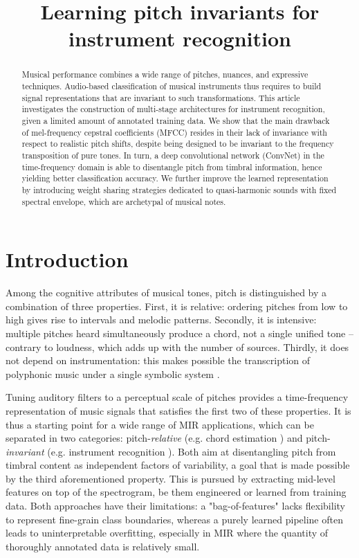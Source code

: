 \documentclass{article}
\title{Learning pitch invariants for instrument recognition}
\makeatletter
\newcommand*{\eg}{e.g.\@\xspace}
\makeatother
\begin{document}
%
\maketitle
%
\begin{abstract}
Musical performance combines a wide range of pitches, nuances,
and expressive techniques.
Audio-based classification of musical instruments thus requires to
build signal representations that are invariant to such transformations.
This article investigates the construction
of multi-stage architectures for instrument recognition,
given a limited amount of annotated training data.
We show that the main drawback of mel-frequency cepstral
coefficients (MFCC) resides in their lack of invariance with respect to
realistic pitch shifts, despite being designed to be invariant
to the frequency transposition of pure tones.
In turn, a deep convolutional network (ConvNet)
in the time-frequency domain is able to disentangle pitch from
timbral information, hence yielding better classification accuracy.
We further improve the learned representation
by introducing weight sharing strategies dedicated to
quasi-harmonic sounds with fixed spectral envelope,
which are archetypal of musical notes.
\end{abstract}

\section{Introduction}\label{sec:introduction}
Among the cognitive attributes of musical tones, pitch is distinguished
by a combination of three properties.
First, it is relative: ordering pitches from low to high gives rise to
intervals and melodic patterns.
Secondly, it is intensive: multiple pitches heard simultaneously produce
a chord, not a single unified tone -- contrary to loudness, which adds
up with the number of sources.
Thirdly, it does not depend on instrumentation: this makes possible
the transcription of polyphonic music under a single symbolic system
\cite{deCheveigne2005}.

Tuning auditory filters to a perceptual scale of pitches provides a
time-frequency representation of music signals that satisfies the first two of these properties.
It is thus a starting point for a wide range of MIR applications,
which can be separated in two categories: pitch-\emph{relative}
(\eg chord estimation \cite{Humphrey2012tonnetz})
and pitch-\emph{invariant} (\eg instrument recognition \cite{Eronen2000}).
Both aim at disentangling pitch from timbral content as independent
factors of variability, a goal that is made possible by the third aforementioned property.
This is pursued by extracting mid-level features on top of the spectrogram,
be them engineered or learned from training data.
Both approaches have their limitations: a "bag-of-features" lacks flexibility
to represent fine-grain class boundaries, whereas a purely learned pipeline
often leads to uninterpretable overfitting, especially in MIR where the quantity
of thoroughly annotated data is relatively small.
\end{document}

